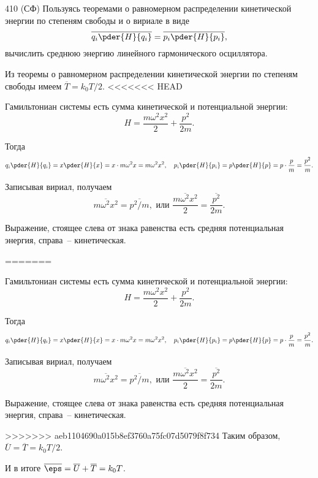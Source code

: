 \documentclass[pscyr]{hedwork}
\begin{document}
  \begin{task}{410 (СФ)}{
    Пользуясь теоремами о равномерном распределении кинетической энергии по
    степеням свободы и о вириале в виде
    \[
      \overline{q_i\pder{H}{q_i}} = \overline{p_i\pder{H}{p_i}},
    \]
    вычислить среднюю энергию линейного гармонического осциллятора.
  }

    Из теоремы о равномерном распределении кинетической энергии по степеням
    свободы имеем \( \overline{T} = k_0T / 2 \).
<<<<<<< HEAD
    
    Гамильтониан системы есть сумма кинетической и потенциальной энергии:
    \[
      H = \frac{m\omega^2x^2}{2} + \frac{p^2}{2m}.
    \]
    
    Тогда
    \[
      q_i\pder{H}{q_i} = x\pder{H}{x} = x\cdot m\omega^2x = m\omega^2x^2, \quad
        p_i\pder{H}{p_i} = p\pder{H}{p} = p\cdot\frac{p}{m} = \frac{p^2}{m}.
    \]
    
    Записывая вириал, получаем
    \[
      \overline{m\omega^2x^2} = \overline{p^2 / m}, \text{ или }
        \overline{\frac{m\omega^2x^2}{2}} = \overline{\frac{p^2}{2m}}.
    \]
    
    Выражение, стоящее слева от знака равенства есть средняя потенциальная
    энергия, справа~-- кинетическая.
    
=======
    
    Гамильтониан системы есть сумма кинетической и потенциальной энергии:
    \[
      H = \frac{m\omega^2x^2}{2} + \frac{p^2}{2m}.
    \]
    
    Тогда
    \[
      q_i\pder{H}{q_i} = x\pder{H}{x} = x\cdot m\omega^2x = m\omega^2x^2, \quad
        p_i\pder{H}{p_i} = p\pder{H}{p} = p\cdot\frac{p}{m} = \frac{p^2}{m}.
    \]
    
    Записывая вириал, получаем
    \[
      \overline{m\omega^2x^2} = \overline{p^2 / m}, \text{ или }
        \overline{\frac{m\omega^2x^2}{2}} = \overline{\frac{p^2}{2m}}.
    \]
    
    Выражение, стоящее слева от знака равенства есть средняя потенциальная
    энергия, справа~-- кинетическая.
    
>>>>>>> aeb1104690a015b8ef3760a75fc07d5079f8f734
    Таким образом, \( \overline{U} = \overline{T} = k_0 T / 2 \).
    
    И в итоге \( \overline{\eps} = \overline{U} + \overline{T} = k_0 T \).

  \end{task}
\end{document}
